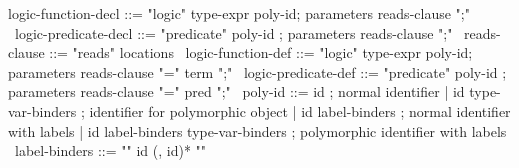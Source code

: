 \begin{syntax}
  logic-function-decl ::= "logic" type-expr poly-id;
  parameters reads-clause ";"
  \
  logic-predicate-decl ::= "predicate" poly-id ;
  parameters reads-clause ";"
  \
  reads-clause ::= "reads" locations
  \
  logic-function-def ::= "logic" type-expr poly-id;
                         parameters {reads-clause} "=" term ";"
  \
  logic-predicate-def ::= "predicate" poly-id ;
  parameters {reads-clause} "=" pred ";"
  \
  poly-id ::= id ; normal identifier
  | id type-var-binders ; identifier for polymorphic object
  | id label-binders ; normal identifier with labels
  | id label-binders type-var-binders ; polymorphic identifier with labels
  \
  label-binders ::= "{" id (, id)* "}"
\end{syntax}